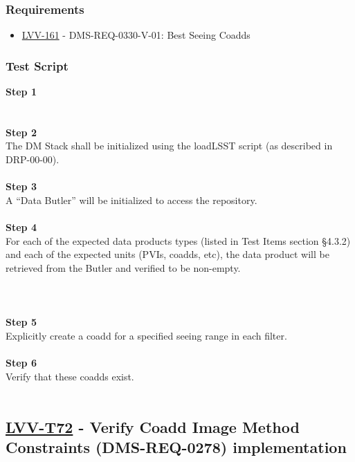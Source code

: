 \hypertarget{requirements-3}{%
\subsubsection{Requirements}\label{requirements-3}}

\begin{itemize}
\tightlist
\item
  \href{https://jira.lsstcorp.org/browse/LVV-161}{LVV-161} -
  DMS-REQ-0330-V-01: Best Seeing Coadds
\end{itemize}

\hypertarget{test-script-1}{%
\subsubsection{Test Script}\label{test-script-1}}

\textbf{Step 1}\\
~\\
~\\
\textbf{Step 2}\\
The DM Stack shall be initialized using the loadLSST script (as
described in DRP-00-00).\\
~\\
\textbf{Step 3}\\
A ``Data Butler'' will be initialized to access the repository.\\
~\\
\textbf{Step 4}\\
For each of the expected data products types (listed in Test Items
section §4.3.2) and each of the expected units (PVIs, coadds, etc), the
data product will be retrieved from the Butler and verified to be
non-empty.\\
~\\
~\\
~\\
\textbf{Step 5}\\
Explicitly create a coadd for a specified seeing range in each filter.\\
~\\
\textbf{Step 6}\\
Verify that these coadds exist.\\
~\\

\hypertarget{lvv-t72---verify-coadd-image-method-constraints-dms-req-0278-implementation}{%
\subsection{\texorpdfstring{\href{https://jira.lsstcorp.org/secure/Tests.jspa\#/testCase/LVV-T72}{LVV-T72}
- Verify Coadd Image Method Constraints (DMS-REQ-0278)
implementation}{LVV-T72 - Verify Coadd Image Method Constraints (DMS-REQ-0278) implementation}}\label{lvv-t72---verify-coadd-image-method-constraints-dms-req-0278-implementation}}

